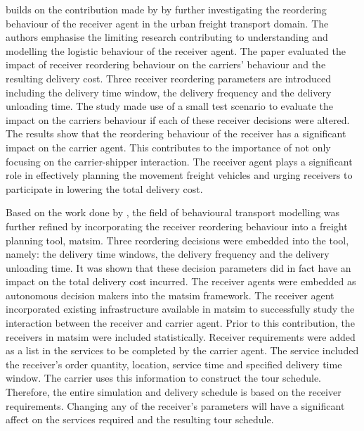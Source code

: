 \citet{bean2018} builds on the contribution made by \citet{anand2014ontology} by further investigating the reordering behaviour of the receiver agent in the urban freight transport domain. The authors emphasise the limiting research contributing to understanding and modelling the logistic behaviour of the receiver agent. The paper evaluated the impact of receiver reordering behaviour on the carriers' behaviour and the resulting delivery cost. Three receiver reordering parameters are introduced including the delivery time window, the delivery frequency and the delivery unloading time. The study made use of a small test scenario to evaluate the impact on the carriers behaviour if each of these receiver decisions were altered. The results show that the reordering behaviour of the receiver has a significant impact on the carrier agent. This contributes to the importance of not only focusing on the carrier-shipper interaction. The receiver agent plays a significant role in effectively planning the movement freight vehicles and urging receivers to participate in lowering the total delivery cost.\par

Based on the work done by \citet{bean2018,bean2019behavioural,schroeder2012towards}, the field of behavioural transport modelling was further refined by incorporating the receiver reordering behaviour into a freight planning tool, \acrshort{matsim}. Three reordering decisions were embedded into the tool, namely: the delivery time windows, the delivery frequency and the delivery unloading time. It was shown that these decision parameters did in fact have an impact on the total delivery cost incurred.  The receiver agents were embedded as autonomous decision makers into the \acrshort{matsim} framework. The receiver agent incorporated existing infrastructure available in \acrshort{matsim} to successfully study the interaction between the receiver and carrier agent. Prior to this contribution, the receivers in \acrshort{matsim} were included statistically. Receiver requirements were added as a list in the services to be completed by the carrier agent. The service included the receiver's order quantity, location, service time and specified delivery time window. The carrier uses this information to construct the tour schedule. Therefore, the entire simulation and delivery schedule is based on the receiver requirements. Changing any of the receiver's parameters will have a significant affect on the services required and the resulting tour schedule. \par

